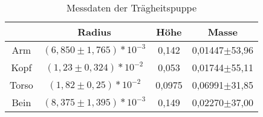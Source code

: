 \begin{table}[h]
	\begin{center}
		\begin{tabular}{c|ccc}
					&Radius						&Höhe	&Masse \\ \hline
			Arm		&$(6,850\pm1,765)*10^{-3}$	&0,142	&0,01447$\pm$53,96\\
			Kopf	&$(1,23\pm0,324)*10^{-2}$	&0,053	&0,01744$\pm$55,11\\
			Torso	&$(1,82\pm0,25)*10^{-2}$	&0,0975	&0,06991$\pm$31,85\\
			Bein	&$(8,375\pm1,395)*10^{-3}$	&0,149	&0,02270$\pm$37,00%
		\end{tabular}
		\caption{Messdaten der Trägheitspuppe}
		\label{tab:puppe}
	\end{center}
\end{table}